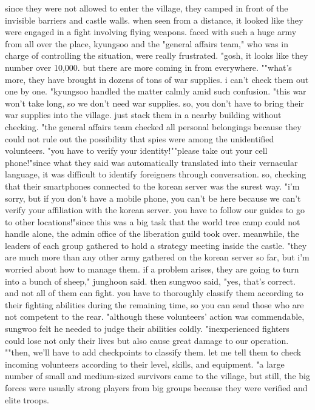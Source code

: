 since they were not allowed to enter the village, they camped in front of the invisible barriers and castle walls.
 when seen from a distance, it looked like they were engaged in a fight involving flying weapons.
faced with such a huge army from all over the place, kyungsoo and the "general affairs team," who was in charge of controlling the situation, were really frustrated.
 "gosh, it looks like they number over 10,000.
 but there are more coming in from everywhere.
""what's more, they have brought in dozens of tons of war supplies.
 i can't check them out one by one.
"kyungsoo handled the matter calmly amid such confusion.
"this war won't take long, so we don't need war supplies.
 so, you don't have to bring their war supplies into the village.
 just stack them in a nearby building without checking.
"the general affairs team checked all personal belongings because they could not rule out the possibility that spies were among the unidentified volunteers.
"you have to verify your identity!""please take out your cell phone!"since what they said was automatically translated into their vernacular language, it was difficult to identify foreigners through conversation.
 so, checking that their smartphones connected to the korean server was the surest way.
"i'm sorry, but if you don't have a mobile phone, you can't be here because we can't verify your affiliation with the korean server.
 you have to follow our guides to go to other locations!"since this was a big task that the world tree camp could not handle alone, the admin office of the liberation guild took over.
 meanwhile, the leaders of each group gathered to hold a strategy meeting inside the castle.
"they are much more than any other army gathered on the korean server so far, but i'm worried about how to manage them.
 if a problem arises, they are going to turn into a bunch of sheep," junghoon said.
 then sungwoo said, "yes, that's correct.
 and not all of them can fight.
 you have to thoroughly classify them according to their fighting abilities during the remaining time, so you can send those who are not competent to the rear.
"although these volunteers' action was commendable, sungwoo felt he needed to judge their abilities coldly.
"inexperienced fighters could lose not only their lives but also cause great damage to our operation.
""then, we'll have to add checkpoints to classify them.
 let me tell them to check incoming volunteers according to their level, skills, and equipment.
"a large number of small and medium-sized survivors came to the village, but still, the big forces were usually strong players from big groups because they were verified and elite troops.
